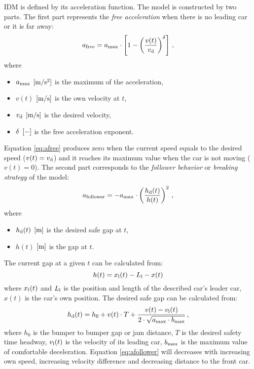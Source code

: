 		IDM is defined by its acceleration function. The model is constructed by two parts. The first part represents the \textit{free acceleration} when there is no leading car or it is far away:
		\begin{equation}
			a_{\rm free}=a_{\rm max}\cdot \left [ 1 - \left ( \frac{v(t)}{v_{\rm d}} \right )^{\rm \delta} \right ]\,,
			\label{eq:afree}
		\end{equation}
		where
		\begin{itemize}
			\item $a_{\rm max}$ $\rm [m/s^2]$ is the maximum of the acceleration,
			\item $v(t)$ $\rm [m/s]$ is the own velocity at $t$,
			\item $v_{\rm d}$ $\rm [m/s]$ is the desired velocity,
			\item $\rm \delta$ $\rm [-]$ is the free acceleration exponent.
		\end{itemize}
		Equation \ref{eq:afree} produces zero when the current speed equals to the desired speed ($v(t)=v_{\rm d}$) and it reaches its maximum value when the car is not moving ($v(t)=0$).
		The second part corresponds to the \textit{follower behavior} or \textit{breaking strategy} of the model:
		\begin{equation}
			a_{\rm follower}=-a_{\rm max}\cdot \left ( \frac{h_{\rm d}(t)}{h(t)} \right )^2\,,
			\label{eq:afollower}
		\end{equation}
		where
		\begin{itemize}
			\item $h_{\rm d}(t)$ $\rm [m]$ is the desired safe gap at $t$,
			\item $h(t)$ $\rm [m]$ is the gap at $t$.
		\end{itemize}
		The current gap at a given $t$ can be calculated from:
		\begin{equation}
			h(t)=x_{\rm l}(t)-L_{\rm l} - x(t)
		\end{equation}
		where $x_{\rm l}(t)$ and $L_{\rm l}$ is the position and length of the described car's leader car, $x(t)$ is the car's own position.
		The desired safe gap can be calculated from:
		\begin{equation}
			h_{\rm d}(t)=h_0 + v(t)\cdot T + \frac{v(t)-v_{\rm l}(t)}{2\cdot \sqrt{a_{\rm max}\cdot b_{\rm max}}}\,,
		\end{equation}
		where $h_0$ is the bumper to bumper gap or jam distance, $T$ is the desired safety time headway, $v_{\rm l}(t)$ is the velocity of its leading car, $b_{\rm max}$ is the maximum value of comfortable deceleration.
		Equation \ref{eq:afollower} will decreases with increasing own speed, increasing velocity difference and decreasing distance to the front car.
